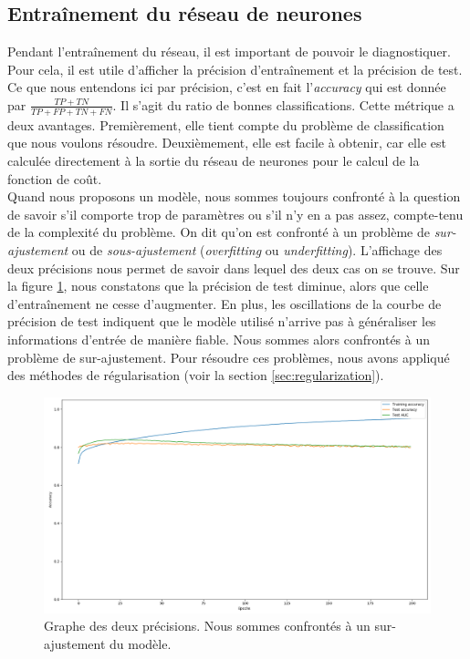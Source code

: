 \documentclass[a4paper,11pt]{article}
\begin{document}
\subsection{Entraînement du réseau de neurones}
    
    Pendant l'entraînement du réseau, il est important de pouvoir le diagnostiquer.
    Pour cela, il est utile d'afficher la précision d'entraînement et la précision de test.
    Ce que nous entendons ici par précision, c'est en fait l'\textit{accuracy} qui est donnée par $\frac{TP+TN}{TP+FP+TN+FN}$.
    Il s'agit du ratio de bonnes classifications.
    Cette métrique a deux avantages. 
    Premièrement, elle tient compte du problème de classification que nous voulons résoudre.
    Deuxièmement, elle est facile à obtenir, car elle est calculée directement à la sortie du réseau de neurones pour le calcul de la fonction de coût.
    \\

    Quand nous proposons un modèle, nous sommes toujours confronté à la question de savoir s'il comporte trop de paramètres ou s'il n'y en a pas assez, compte-tenu de la complexité du problème.
    On dit qu'on est confronté à un problème de \textit{sur-ajustement} ou de
    \textit{sous-ajustement} (\textit{overfitting} ou \textit{underfitting}).
    L'affichage des deux précisions nous permet de savoir dans lequel des deux cas on se trouve.
    Sur la figure \ref{fig:overfitting_1}, nous constatons que la précision de test diminue, alors que celle d'entraînement ne cesse d'augmenter.
    En plus, les oscillations de la courbe de précision de test indiquent que le modèle utilisé n'arrive pas à généraliser les informations d'entrée de manière fiable.
    Nous sommes alors confrontés à un problème de sur-ajustement.
    Pour résoudre ces problèmes, nous avons appliqué des méthodes de régularisation (voir la section
    \ref{sec:regularization}).

	\begin{figure}[H]
	    \centering
	    \includegraphics[scale=0.3]{overfitting_1.png}
	    \caption{Graphe des deux précisions. Nous sommes confrontés à un sur-ajustement du modèle.}
	    \label{fig:overfitting_1}
	\end{figure}
\end{document}
